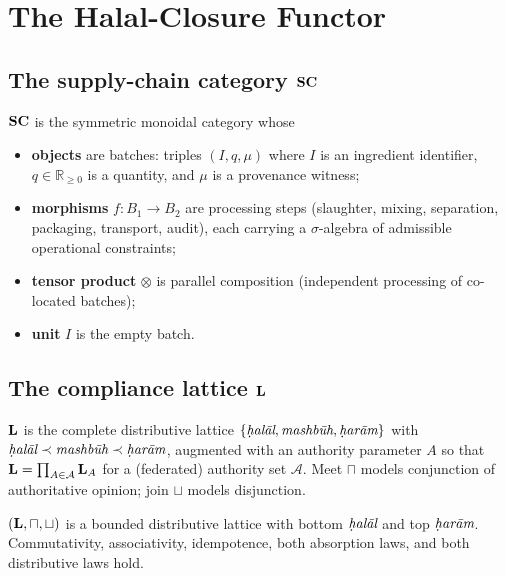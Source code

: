 \section{The Halal-Closure Functor}
\label{sec:hcf}

\subsection{The supply-chain category $\SC$}

\begin{definition}
\label{def:sc}
$\SC$ is the symmetric monoidal category whose
\begin{itemize}
  \item \textbf{objects} are batches: triples $(I, q, \mu)$ where $I$ is
        an ingredient identifier, $q \in \mathbb{R}_{\geq 0}$ is a
        quantity, and $\mu$ is a provenance witness;
  \item \textbf{morphisms} $f \colon B_1 \to B_2$ are processing steps
        (slaughter, mixing, separation, packaging, transport, audit),
        each carrying a $\sigma$-algebra of admissible operational
        constraints;
  \item \textbf{tensor product} $\otimes$ is parallel composition
        (independent processing of co-located batches);
  \item \textbf{unit} $I$ is the empty batch.
\end{itemize}
\end{definition}

\subsection{The compliance lattice $\Lat$}

\begin{definition}
\label{def:lat}
$\Lat$ is the complete distributive lattice
$\{\halal, \mashbuh, \haram\}$ with $\halal \prec \mashbuh \prec \haram$,
augmented with an authority parameter $A$ so that
$\Lat = \prod_{A \in \mathcal{A}} \Lat_A$ for a (federated) authority
set $\mathcal{A}$. Meet $\sqcap$ models conjunction of authoritative
opinion; join $\sqcup$ models disjunction.
\end{definition}

\begin{theorem}
\label{thm:lattice-laws}
$(\Lat, \sqcap, \sqcup)$ is a bounded distributive lattice with
bottom $\halal$ and top $\haram$. Commutativity, associativity,
idempotence, both absorption laws, and both distributive laws hold.
\end{theorem}


